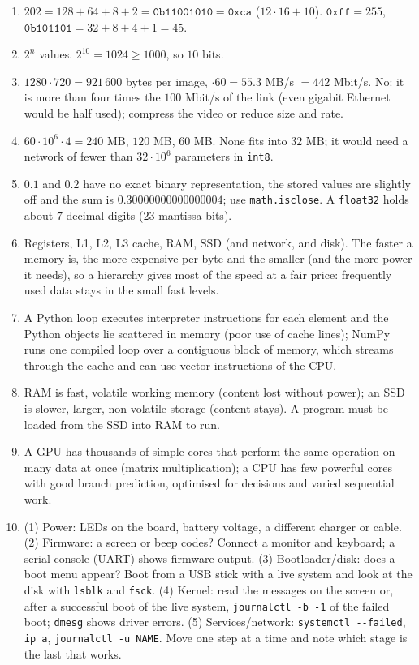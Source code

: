 \begin{enumerate}[label=\textbf{\ansnum.\arabic*}]
  \item $202=128+64+8+2=\texttt{0b11001010}=\texttt{0xca}$ ($12\cdot16+10$). $\texttt{0xff}=255$, $\texttt{0b101101}=32+8+4+1=45$.
  \item $2^n$ values. $2^{10}=1024\ge1000$, so $10$ bits.
  \item $1280\cdot720=921\,600$ bytes per image, $\cdot60=55.3$ MB/s $=442$ Mbit/s. No: it is more than four times the $100$ Mbit/s of the link (even gigabit Ethernet would be half used); compress the video or reduce size and rate.
  \item $60\cdot10^6\cdot4=240$ MB, $120$ MB, $60$ MB. None fits into $32$ MB; it would need a network of fewer than $32\cdot10^6$ parameters in \texttt{int8}.
  \item $0.1$ and $0.2$ have no exact binary representation, the stored values are slightly off and the sum is $0.30000000000000004$; use \texttt{math.isclose}. A \texttt{float32} holds about $7$ decimal digits ($23$ mantissa bits).
  \item Registers, L1, L2, L3 cache, RAM, SSD (and network, and disk). The faster a memory is, the more expensive per byte and the smaller (and the more power it needs), so a hierarchy gives most of the speed at a fair price: frequently used data stays in the small fast levels.
  \item A Python loop executes interpreter instructions for each element and the Python objects lie scattered in memory (poor use of cache lines); NumPy runs one compiled loop over a contiguous block of memory, which streams through the cache and can use vector instructions of the CPU.
  \item RAM is fast, volatile working memory (content lost without power); an SSD is slower, larger, non-volatile storage (content stays). A program must be loaded from the SSD into RAM to run.
  \item A GPU has thousands of simple cores that perform the same operation on many data at once (matrix multiplication); a CPU has few powerful cores with good branch prediction, optimised for decisions and varied sequential work.
  \item[\textbf{\ansnum.10}] (1) Power: LEDs on the board, battery voltage, a different charger or cable. (2) Firmware: a screen or beep codes? Connect a monitor and keyboard; a serial console (UART) shows firmware output. (3) Bootloader/disk: does a boot menu appear? Boot from a USB stick with a live system and look at the disk with \texttt{lsblk} and \texttt{fsck}. (4) Kernel: read the messages on the screen or, after a successful boot of the live system, \verb!journalctl -b -1! of the failed boot; \texttt{dmesg} shows driver errors. (5) Services/network: \verb!systemctl --failed!, \verb!ip a!, \verb!journalctl -u NAME!. Move one step at a time and note which stage is the last that works.
\end{enumerate}
